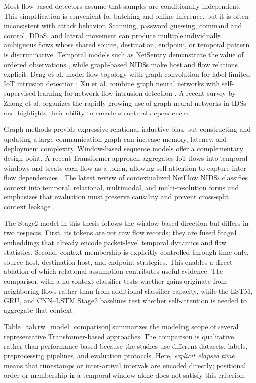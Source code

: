 Most flow-based detectors assume that samples are conditionally independent.
This simplification is convenient for batching and online inference, but it is
often inconsistent with attack behavior. Scanning, password guessing, command
and control, DDoS, and lateral movement can produce multiple individually
ambiguous flows whose shared source, destination, endpoint, or temporal pattern
is discriminative. Temporal models such as NetSentry demonstrate the value of
ordered observations \cite{LiuPatras2022NetSentry}, while graph-based NIDSs make
host and flow relations explicit. Deng et al. model flow topology with graph
convolution for label-limited IoT intrusion detection
\cite{Deng2023FlowTopology}; Xu et al. combine graph neural networks with
self-supervised learning for network-flow intrusion detection
\cite{Xu2024SSLGNN}. A recent survey by Zhong et al. organizes the rapidly
growing use of graph neural networks in IDSs and highlights their ability to
encode structural dependencies \cite{Zhong2024GNNSurvey}.

Graph methods provide expressive relational inductive bias, but constructing
and updating a large communication graph can increase memory, latency, and
deployment complexity. Window-based sequence models offer a complementary
design point. A recent Transformer approach aggregates IoT flows into temporal
windows and treats each flow as a token, allowing self-attention to capture
inter-flow dependencies \cite{MartinReizabal2026FlowWindow}. The latest review
of contextualized NetFlow NIDSs classifies context into temporal, relational,
multimodal, and multi-resolution forms and emphasizes that evaluation must
preserve causality and prevent cross-split context leakage
\cite{ElMahdaouy2026ContextNetFlow}.

The Stage2 model in this thesis follows the window-based direction but differs
in two respects. First, its tokens are not raw flow records; they are fused
Stage1 embeddings that already encode packet-level temporal dynamics and flow
statistics. Second, context membership is explicitly controlled through
time-only, source-host, destination-host, and endpoint strategies. This enables
a direct ablation of which relational assumption contributes useful evidence.
The comparison with a no-context classifier tests whether gains originate from
neighboring flows rather than from additional classifier capacity, while the
LSTM, GRU, and CNN--LSTM Stage2 baselines test whether self-attention is needed
to aggregate that context.

Table~\ref{tab:rw_model_comparison} summarizes the modeling scope of several
representative Transformer-based approaches. The comparison is qualitative
rather than performance-based because the studies use different datasets,
labels, preprocessing pipelines, and evaluation protocols. Here,
\emph{explicit elapsed time} means that timestamps or inter-arrival intervals
are encoded directly; positional order or membership in a temporal window alone
does not satisfy this criterion.

